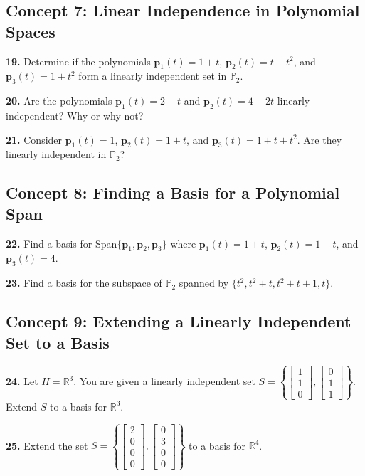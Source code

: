 \documentclass[11pt]{article}
\begin{document}
\subsection*{Concept 7: Linear Independence in Polynomial Spaces}
\textbf{19.} Determine if the polynomials $\mathbf{p}_1(t) = 1+t$, $\mathbf{p}_2(t) = t+t^2$, and $\mathbf{p}_3(t) = 1+t^2$ form a linearly independent set in $\mathbb{P}_2$.

\vspace{0.5cm}
\textbf{20.} Are the polynomials $\mathbf{p}_1(t) = 2-t$ and $\mathbf{p}_2(t) = 4-2t$ linearly independent? Why or why not?

\vspace{0.5cm}
\textbf{21.} Consider $\mathbf{p}_1(t) = 1$, $\mathbf{p}_2(t) = 1+t$, and $\mathbf{p}_3(t) = 1+t+t^2$. Are they linearly independent in $\mathbb{P}_2$?

\subsection*{Concept 8: Finding a Basis for a Polynomial Span}
\textbf{22.} Find a basis for Span$\{\mathbf{p}_1, \mathbf{p}_2, \mathbf{p}_3\}$ where $\mathbf{p}_1(t) = 1+t$, $\mathbf{p}_2(t) = 1-t$, and $\mathbf{p}_3(t) = 4$.

\vspace{0.5cm}
\textbf{23.} Find a basis for the subspace of $\mathbb{P}_2$ spanned by $\{t^2, t^2+t, t^2+t+1, t\}$.

\subsection*{Concept 9: Extending a Linearly Independent Set to a Basis}
\textbf{24.} Let $H = \mathbb{R}^3$. You are given a linearly independent set $S = \left\{ \begin{bmatrix} 1 \\ 1 \\ 0 \end{bmatrix}, \begin{bmatrix} 0 \\ 1 \\ 1 \end{bmatrix} \right\}$. Extend $S$ to a basis for $\mathbb{R}^3$.

\vspace{0.5cm}
\textbf{25.} Extend the set $S = \left\{ \begin{bmatrix} 2 \\ 0 \\ 0 \\ 0 \end{bmatrix}, \begin{bmatrix} 0 \\ 3 \\ 0 \\ 0 \end{bmatrix} \right\}$ to a basis for $\mathbb{R}^4$.
\end{document}
